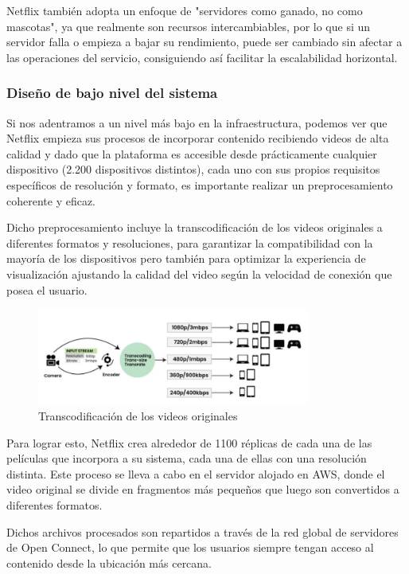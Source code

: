 \documentclass[12pt,a4paper]{article}
\begin{document}
    Netflix también adopta un enfoque de "servidores como ganado, no como mascotas", ya que realmente son recursos intercambiables, por lo que si un servidor falla o empieza a bajar su rendimiento, puede ser cambiado sin afectar a las operaciones del servicio, consiguiendo así facilitar la escalabilidad horizontal.

    \subsubsection{Diseño de bajo nivel del sistema}

    Si nos adentramos a un nivel más bajo en la infraestructura, podemos ver que Netflix empieza sus procesos de incorporar contenido recibiendo videos de alta calidad y dado que la plataforma es accesible desde prácticamente cualquier dispositivo (2.200 dispositivos distintos), cada uno con sus propios requisitos específicos de resolución y formato, es importante realizar un preprocesamiento coherente y eficaz.

    Dicho preprocesamiento incluye la transcodificación de los videos originales a diferentes formatos y resoluciones, para garantizar la compatibilidad con la mayoría de los dispositivos pero también para optimizar la experiencia de visualización ajustando la calidad del video según la velocidad de conexión que posea el usuario.

    \begin{figure}[H]
        \centering
        \includegraphics[width=0.8\textwidth]{./img/transcodificacion_netflix.png}
        \caption{Transcodificación de los videos originales}
        \label{fig:netflix_transcoding}
    \end{figure}

    Para lograr esto, Netflix crea alrededor de 1100 réplicas de cada una de las películas que incorpora a su sistema, cada una de ellas con una resolución distinta. Este proceso se lleva a cabo en el servidor alojado en AWS, donde el video original se divide en fragmentos más pequeños que luego son convertidos a diferentes formatos.

    Dichos archivos procesados son repartidos a través de la red global de servidores de Open Connect, lo que permite que los usuarios siempre tengan acceso al contenido desde la ubicación más cercana.
\end{document}
